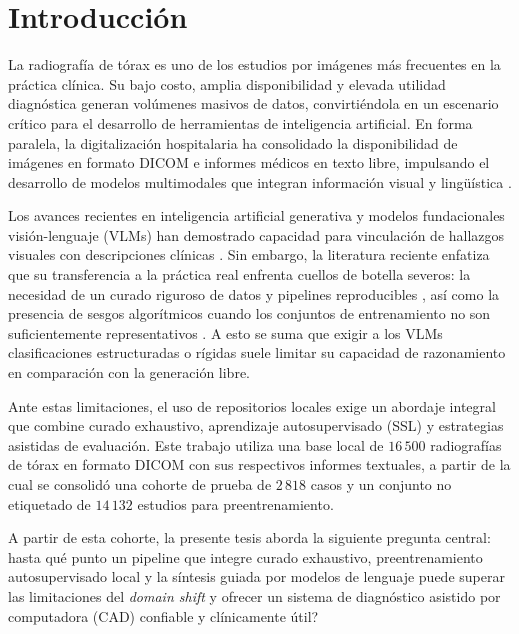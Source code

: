 \documentclass[../main.tex]{subfiles} %
\begin{document}
\chapter*{Introducción}

La radiografía de tórax es uno de los estudios por imágenes más frecuentes en la práctica clínica. Su bajo costo, amplia disponibilidad y elevada utilidad diagnóstica generan volúmenes masivos de datos, convirtiéndola en un escenario crítico para el desarrollo de herramientas de inteligencia artificial. En forma paralela, la digitalización hospitalaria ha consolidado la disponibilidad de imágenes en formato DICOM e informes médicos en texto libre, impulsando el desarrollo de modelos multimodales que integran información visual y lingüística \citep{1ref}.

Los avances recientes en inteligencia artificial generativa y modelos fundacionales visión-lenguaje (VLMs) han demostrado capacidad para vinculación de hallazgos visuales con descripciones clínicas \citep{2ref,Doshi_et_al._2024}. Sin embargo, la literatura reciente enfatiza que su transferencia a la práctica real enfrenta cuellos de botella severos: la necesidad de un curado riguroso de datos y pipelines reproducibles \citep{4ref,5ref}, así como la presencia de sesgos algorítmicos cuando los conjuntos de entrenamiento no son suficientemente representativos \citep{Drukker_et_al._2023}. A esto se suma que exigir a los VLMs clasificaciones estructuradas o rígidas suele limitar su capacidad de razonamiento en comparación con la generación libre.

Ante estas limitaciones, el uso de repositorios locales exige un abordaje integral que combine curado exhaustivo, aprendizaje autosupervisado (SSL) y estrategias asistidas de evaluación. Este trabajo utiliza una base local de $16\,500$ radiografías de tórax en formato DICOM con sus respectivos informes textuales, a partir de la cual se consolidó una cohorte de prueba de $2\,818$ casos y un conjunto no etiquetado de $14\,132$ estudios para preentrenamiento.

A partir de esta cohorte, la presente tesis aborda la siguiente pregunta central: \textquestiondown hasta qué punto un pipeline que integre curado exhaustivo, preentrenamiento autosupervisado local y la síntesis guiada por modelos de lenguaje puede superar las limitaciones del \textit{domain shift} y ofrecer un sistema de diagnóstico asistido por computadora (CAD) confiable y clínicamente útil?
\end{document}
